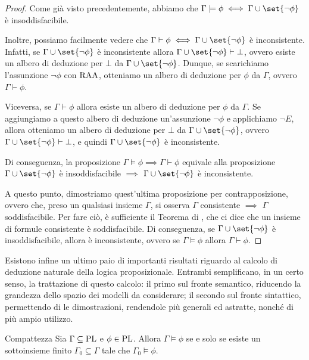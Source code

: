 \begin{proof}
  Come già visto precedentemente, abbiamo che \(\Gamma\models\phi \iff \Gamma \cup \set{\neg\phi}\) è insoddisfacibile.

  Inoltre, possiamo facilmente vedere che \(\Gamma\vdash \phi \iff \Gamma \cup \set{\neg\phi}\) è inconsistente.
  Infatti, se \(\Gamma \cup \set{\neg\phi}\) è inconsistente allora \(\Gamma \cup \set{\neg\phi}\vdash \bot\), ovvero esiste un albero di deduzione per \(\bot\) da \(\Gamma \cup \set{\neg\phi}\). Dunque, se scarichiamo l'assunzione \(\neg\phi\) con \(\operatorname{RAA}\), otteniamo un albero di deduzione per \(\phi\) da \(\Gamma\), ovvero \(\Gamma\vdash\phi\).

  Viceversa, se \(\Gamma\vdash\phi\) allora esiste un albero di deduzione per \(\phi\) da \(\Gamma\). Se aggiungiamo a questo albero di deduzione un'assunzione \(\neg\phi\) e applichiamo \(\neg E\), allora otteniamo un albero di deduzione per \(\bot\) da \(\Gamma \cup \set{\neg\phi}\), ovvero \(\Gamma \cup \set{\neg\phi}\vdash\bot\), e quindi \(\Gamma \cup \set{\neg\phi}\) è inconsistente.

  Di conseguenza, la proposizione \(\Gamma\models\phi \implies \Gamma\vdash\phi\) equivale alla proposizione \(\Gamma \cup \set{\neg\phi}\) è insoddisfacibile \(\implies\) \(\Gamma \cup \set{\neg\phi}\) è inconsistente.

  A questo punto, dimostriamo quest'ultima proposizione per contrapposizione, ovvero che, preso un qualsiasi insieme \(\Gamma\), si osserva \(\Gamma\) consistente \(\implies\) \(\Gamma\)soddisfacibile.
  Per fare ciò, è sufficiente il Teorema di , che ci dice che un insieme di formule consistente è soddisfacibile. Di conseguenza, se \(\Gamma\cup\set{\neg\phi}\) è insoddisfacibile, allora è inconsistente, ovvero se \(\Gamma\models\phi\) allora \(\Gamma\vdash\phi\).
\end{proof}

Esistono infine un ultimo paio di importanti risultati riguardo al calcolo di deduzione naturale della logica proposizionale. 
Entrambi semplificano, in un certo senso, la trattazione di questo calcolo: il primo sul fronte semantico, riducendo la grandezza dello spazio dei modelli da considerare; il secondo sul fronte sintattico, permettendo di  le dimostrazioni, rendendole più generali ed astratte, nonché di più ampio utilizzo.

\begin{theorem}{Compattezza}
  Sia \(\Gamma \subseteq \operatorname{PL}\) e \(\phi \in \operatorname{PL}\). Allora \(\Gamma \models \phi\) se e solo se esiste un sottoinsieme finito \(\Gamma_0 \subseteq \Gamma\) tale che \(\Gamma_0 \models \phi\).
\end{theorem}

